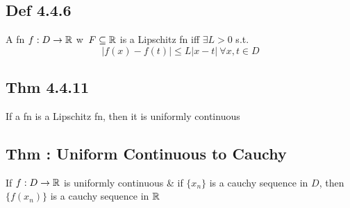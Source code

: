 \subsection*{Def 4.4.6}
    A fn $f : D \to \mathbb{R}$ w\ $F\subseteq \mathbb{R}$ is a Lipschitz fn iff $\exists L > 0$ s.t. 
    \[
    | f(x) - f(t) | \le L | x - t | \ \forall x, t \in D
    \] 

\subsection*{Thm 4.4.11}
    If a fn is a Lipschitz fn, then it is uniformly continuous

\subsection*{Thm : Uniform Continuous to Cauchy}
If $f : D \to \mathbb{R}$ is uniformly continuous \& if $ \{ x_{n} \} $ is a cauchy sequence in $D$, then $\{ f(x_{n}) \} $ is a cauchy sequence in $\mathbb{R}$
    



